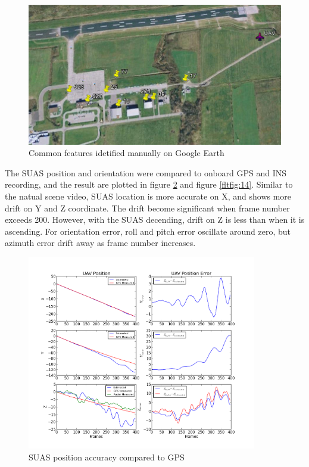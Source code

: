 \begin{figure}[h]
\centering
\includegraphics[width=13cm, keepaspectratio=true]
{./Figures/fltfig/airport/uav_and_identified_landmark.png}
\caption{Common features idetified manually on Google Earth }
\label{fltfig:12}
\end{figure}
\FloatBarrier

The SUAS position and orientation were compared to onboard GPS and INS
recording, and the result are plotted in figure \ref{fltfig:13} and
figure \ref{fltfig:14}. Similar to the natual scene video, SUAS
location is more accurate on X, and shows more drift on Y and Z
coordinate. The drift become significant when frame number exceeds
200. However, with the SUAS decending, drift on Z is less than when it
is ascending. For orientation error, roll and pitch error oscillate
around zero, but azimuth error drift away as frame number increases. 

\begin{figure}[h]
\centering
\includegraphics[width=10cm, keepaspectratio=true]
{./Figures/fltfig/airport/UAV_position_and_error.png}
\caption{SUAS position accuracy compared to GPS}
\label{fltfig:13}
\end{figure}

